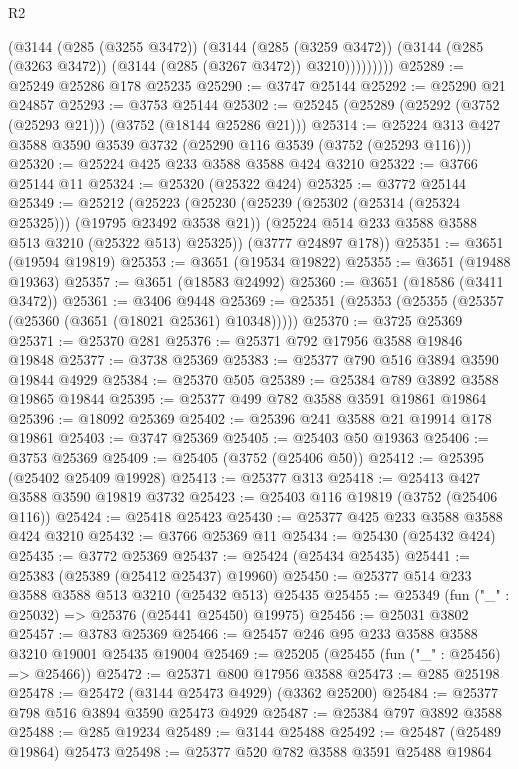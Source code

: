 \begin{lexlean}{R2}
\begin{coremodule}
              (@3144
                (@285 (@3255 @3472))
                (@3144
                  (@285 (@3259 @3472))
                  (@3144 (@285 (@3263 @3472)) (@3144 (@285 (@3267 @3472)) @3210)))))))))
@25289 := @25249 @25286 @178 @25235
@25290 := @3747 @25144
@25292 := @25290 @21 @24857
@25293 := @3753 @25144
@25302 := @25245 (@25289 (@25292 (@3752 (@25293 @21))) (@3752 (@18144 @25286 @21)))
@25314 := @25224 @313 @427 @3588 @3590 @3539 @3732 (@25290 @116 @3539 (@3752 (@25293 @116)))
@25320 := @25224 @425 @233 @3588 @3588 @424 @3210
@25322 := @3766 @25144 @11
@25324 := @25320 (@25322 @424)
@25325 := @3772 @25144
@25349 := @25212
    (@25223
      (@25230
        (@25239 (@25302 (@25314 (@25324 @25325))) (@19795 @23492 @3538 @21))
        (@25224 @514 @233 @3588 @3588 @513 @3210 (@25322 @513) @25325))
      (@3777 @24897 @178))
@25351 := @3651 (@19594 @19819)
@25353 := @3651 (@19534 @19822)
@25355 := @3651 (@19488 @19363)
@25357 := @3651 (@18583 @24992)
@25360 := @3651 (@18586 (@3411 @3472))
@25361 := @3406 @9448
@25369 := @25351 (@25353 (@25355 (@25357 (@25360 (@3651 (@18021 @25361) @10348)))))
@25370 := @3725 @25369
@25371 := @25370 @281
@25376 := @25371 @792 @17956 @3588 @19846 @19848
@25377 := @3738 @25369
@25383 := @25377 @790 @516 @3894 @3590 @19844 @4929
@25384 := @25370 @505
@25389 := @25384 @789 @3892 @3588 @19865 @19844
@25395 := @25377 @499 @782 @3588 @3591 @19861 @19864
@25396 := @18092 @25369
@25402 := @25396 @241 @3588 @21 @19914 @178 @19861
@25403 := @3747 @25369
@25405 := @25403 @50 @19363
@25406 := @3753 @25369
@25409 := @25405 (@3752 (@25406 @50))
@25412 := @25395 (@25402 @25409 @19928)
@25413 := @25377 @313
@25418 := @25413 @427 @3588 @3590 @19819 @3732
@25423 := @25403 @116 @19819 (@3752 (@25406 @116))
@25424 := @25418 @25423
@25430 := @25377 @425 @233 @3588 @3588 @424 @3210
@25432 := @3766 @25369 @11
@25434 := @25430 (@25432 @424)
@25435 := @3772 @25369
@25437 := @25424 (@25434 @25435)
@25441 := @25383 (@25389 (@25412 @25437) @19960)
@25450 := @25377 @514 @233 @3588 @3588 @513 @3210 (@25432 @513) @25435
@25455 := @25349 (fun ("_" : @25032) => @25376 (@25441 @25450) @19975)
@25456 := @25031 @3802
@25457 := @3783 @25369
@25466 := @25457 @246 @95 @233 @3588 @3588 @3210 @19001 @25435 @19004
@25469 := @25205 (@25455 (fun ("_" : @25456) => @25466))
@25472 := @25371 @800 @17956 @3588
@25473 := @285 @25198
@25478 := @25472 (@3144 @25473 @4929) (@3362 @25200)
@25484 := @25377 @798 @516 @3894 @3590 @25473 @4929
@25487 := @25384 @797 @3892 @3588
@25488 := @285 @19234
@25489 := @3144 @25488
@25492 := @25487 (@25489 @19864) @25473
@25498 := @25377 @520 @782 @3588 @3591 @25488 @19864

\end{coremodule}
\end{lexlean}
